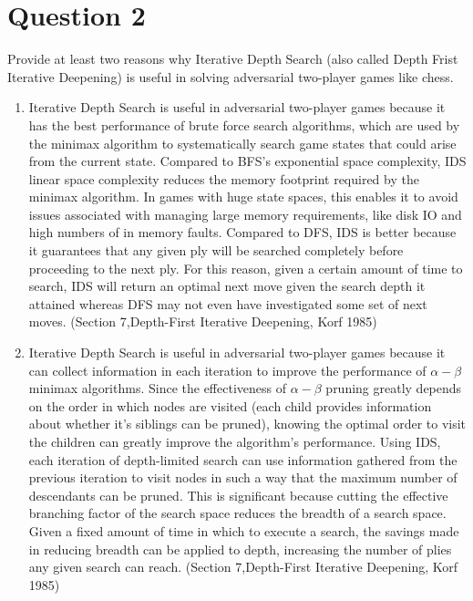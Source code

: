 \documentclass{article}
\begin{document}
    \newpage
    \section*{Question 2}
    Provide at least two reasons why Iterative Depth Search (also called Depth Frist Iterative Deepening) is useful in solving adversarial two-player games like chess.
    \newline
    \begin{enumerate}
        \item Iterative Depth Search is useful in adversarial two-player games because it has the best performance of brute force search algorithms, which are used by the minimax algorithm to systematically search game states that could arise from the current state. Compared to BFS's exponential space complexity, IDS linear space complexity reduces the memory footprint required by the minimax algorithm. In games with huge state spaces, this enables it to avoid issues associated with managing large memory requirements, like disk IO and high numbers of in memory faults. Compared to DFS, IDS is better because it guarantees that any given ply will be searched completely before proceeding to the next ply. For this reason, given a certain amount of time to search, IDS will return an optimal next move given the search depth it attained whereas DFS may not even have investigated some set of next moves. (Section 7,Depth-First Iterative Deepening, Korf 1985)
        \item Iterative Depth Search is useful in adversarial two-player games because it can collect information in each iteration to improve the performance of $\alpha-\beta$ minimax algorithms. Since the effectiveness of $\alpha-\beta$ pruning greatly depends on the order in which nodes are visited (each child provides information about whether it's siblings can be pruned), knowing the optimal order to visit the children can greatly improve the algorithm's performance. Using IDS, each iteration of depth-limited search can use information gathered from the previous iteration to visit nodes in such a way that the maximum number of descendants can be pruned. This is significant because cutting the effective branching factor of the search space reduces the breadth of a search space. Given a fixed amount of time in which to execute a search, the savings made in reducing breadth can be applied to depth, increasing the number of plies any given search can reach. (Section 7,Depth-First Iterative Deepening, Korf 1985)
    \end{enumerate}
    \newpage
\end{document}
